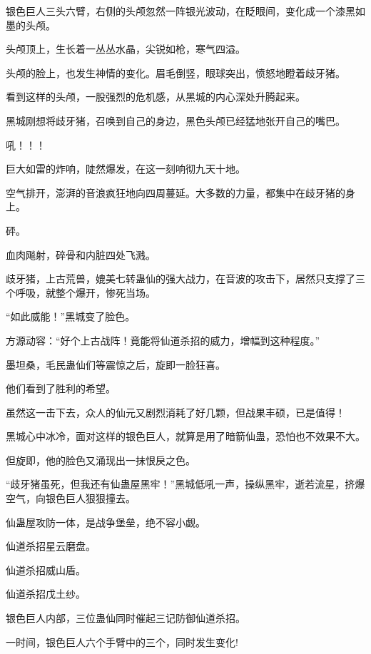 \begin{this_body}
银色巨人三头六臂，右侧的头颅忽然一阵银光波动，在眨眼间，变化成一个漆黑如墨的头颅。

头颅顶上，生长着一丛丛水晶，尖锐如枪，寒气四溢。

头颅的脸上，也发生神情的变化。眉毛倒竖，眼球突出，愤怒地瞪着歧牙猪。

看到这样的头颅，一股强烈的危机感，从黑城的内心深处升腾起来。

黑城刚想将歧牙猪，召唤到自己的身边，黑色头颅已经猛地张开自己的嘴巴。

吼！！！

巨大如雷的炸响，陡然爆发，在这一刻响彻九天十地。

空气排开，澎湃的音浪疯狂地向四周蔓延。大多数的力量，都集中在歧牙猪的身上。

砰。

血肉飚射，碎骨和内脏四处飞溅。

歧牙猪，上古荒兽，媲美七转蛊仙的强大战力，在音波的攻击下，居然只支撑了三个呼吸，就整个爆开，惨死当场。

“如此威能！”黑城变了脸色。

方源动容：“好个上古战阵！竟能将仙道杀招的威力，增幅到这种程度。”

墨坦桑，毛民蛊仙们等震惊之后，旋即一脸狂喜。

他们看到了胜利的希望。

虽然这一击下去，众人的仙元又剧烈消耗了好几颗，但战果丰硕，已是值得！

黑城心中冰冷，面对这样的银色巨人，就算是用了暗箭仙蛊，恐怕也不效果不大。

但旋即，他的脸色又涌现出一抹恨戾之色。

“歧牙猪虽死，但我还有仙蛊屋黑牢！”黑城低吼一声，操纵黑牢，逝若流星，挤爆空气，向银色巨人狠狠撞去。

仙蛊屋攻防一体，是战争堡垒，绝不容小觑。

仙道杀招星云磨盘。

仙道杀招威山盾。

仙道杀招戊土纱。

银色巨人内部，三位蛊仙同时催起三记防御仙道杀招。

一时间，银色巨人六个手臂中的三个，同时发生变化!

\end{this_body}


